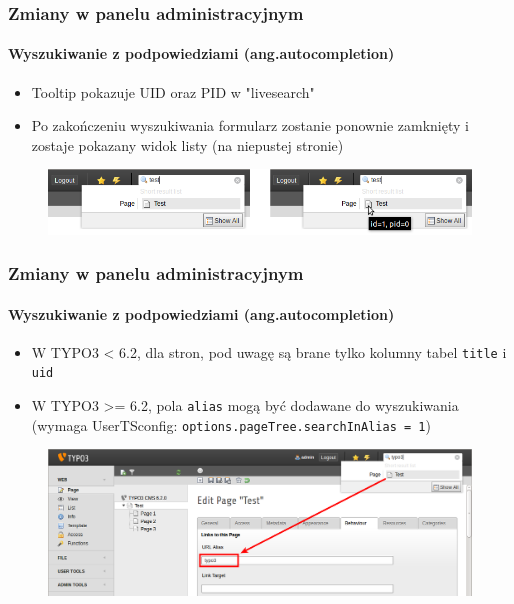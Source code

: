 
\begin{frame}[fragile]
	\frametitle{Zmiany w panelu administracyjnym}
	\framesubtitle{Wyszukiwanie z podpowiedziami (ang.autocompletion) }

	\begin{itemize}
		\item Tooltip pokazuje UID oraz PID w "livesearch"
		\item Po zakończeniu wyszukiwania formularz zostanie ponownie zamknięty i zostaje pokazany widok listy (na niepustej stronie)
	\end{itemize}

	\begin{figure}
		\includegraphics[width=0.8\linewidth]{Images/BackendChanges/LiveSearchTooltip.png}
	\end{figure}

\end{frame}


\begin{frame}[fragile]
	\frametitle{Zmiany w panelu administracyjnym}
	\framesubtitle{Wyszukiwanie z podpowiedziami (ang.autocompletion) }

	\begin{itemize}
		\item W TYPO3 < 6.2, dla stron, pod uwagę są brane tylko kolumny tabel \texttt{title} i \texttt{uid}
		\item W TYPO3 >= 6.2, pola \texttt{alias} mogą być dodawane do wyszukiwania\newline
			(wymaga UserTSconfig: \texttt{options.pageTree.searchInAlias = 1})
	\end{itemize}

	\begin{figure}
		\includegraphics[width=0.95\linewidth]{Images/BackendChanges/LiveSearchInAlias.png}
	\end{figure}

\end{frame}

